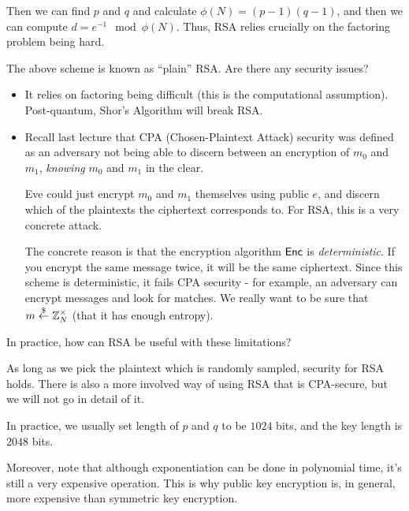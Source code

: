 Then we can find $p$ and $q$ and calculate $\phi(N) = (p-1)(q-1)$, and then we can compute $d = e^{-1}\mod{\phi(N)}$. Thus, RSA relies crucially on the factoring problem being hard.
    
\begin{ques*}
    The above scheme is known as ``plain'' RSA. Are there any security issues?
\end{ques*}
\begin{itemize}
    \item It relies on factoring being difficult (this is the computational assumption). Post-quantum, Shor's Algorithm will break RSA.
    \item Recall last lecture that CPA (Chosen-Plaintext Attack) security was defined as an adversary not being able to discern between an encryption of $m_0$ and $m_1$, \emph{knowing} $m_0$ and $m_1$ in the clear.

          Eve could just encrypt $m_0$ and $m_1$ themselves using public $e$, and discern which of the plaintexts the ciphertext corresponds to. For RSA, this is a very concrete attack.

          The concrete reason is that the encryption algorithm $\operatorname{\mathsf{Enc}}$ is \emph{deterministic}. If you encrypt the same message twice, it will be the same ciphertext. Since this scheme is deterministic, it fails CPA security - for example, an adversary can encrypt messages and look for matches. We really want to be sure that $m\overset{\$}{\leftarrow} \mathbb Z_N^\times$ (that it has enough entropy).
\end{itemize}

\begin{ques*}
    In practice, how can RSA be useful with these limitations?
\end{ques*}

As long as we pick the plaintext which is randomly sampled, security for RSA holds. There is also a more involved way of using RSA that is CPA-secure, but we will not go in detail of it.

\begin{remark*}
    In practice, we usually set length of $p$ and $q$ to be $1024$ bits, and the key length is $2048$ bits.

    Moreover, note that although exponentiation can be done in polynomial time, it's still a very expensive operation. This is why public key encryption is, in general, more expensive than symmetric key encryption.
\end{remark*}


